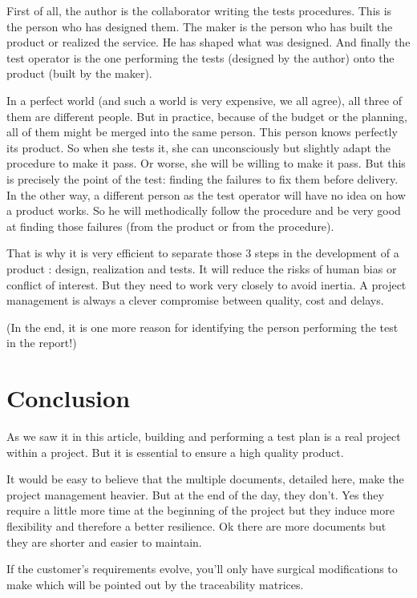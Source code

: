 First of all, the author is the collaborator writing the tests procedures. This is the person who has designed them.
The maker is the person who has built the product or realized the service. He has shaped what was designed.
And finally the test operator is the one performing the tests (designed by the author) onto the product (built by the maker).

In a perfect world (and such a world is very expensive, we all agree), all three of them are different people. But in practice, because of the budget or the planning, all of them might be merged into the same person. This person knows perfectly its product. So when she tests it, she can unconsciously but slightly adapt the procedure to make it pass. Or worse, she will be willing to make it pass. But this is precisely the point of the test: finding the failures to fix them before delivery.
In the other way, a different person as the test operator will have no idea on how a product works. So he will methodically follow the procedure and be very good at finding those failures (from the product or from the procedure).

That is why it is very efficient to separate those 3 steps in the development of a product : design, realization and tests. It will reduce the risks of human bias or conflict of interest. But they need to work very closely to avoid inertia. A project management is always a clever compromise between quality, cost and delays.

(In the end, it is one more reason for identifying the person performing the test in the report!)

\section{Conclusion}
As we saw it in this article, building and performing a test plan is a real project within a project. But it is essential to ensure a high quality product.

It would be easy to believe that the multiple documents, detailed here, make the project management heavier. But at the end of the day, they don’t. Yes they require a little more time at the beginning of the project but they induce more flexibility and therefore a better resilience. Ok there are more documents but they are shorter and easier to maintain.

If the customer’s requirements evolve, you’ll only have surgical modifications to make which will be pointed out by the traceability matrices.
